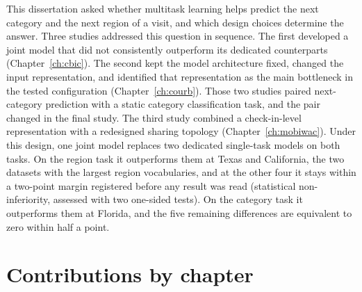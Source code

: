 This dissertation asked whether multitask learning helps predict the next category and
the next region of a visit, and which design choices determine the answer. Three studies
addressed this question in sequence. The first developed a joint model that did not
consistently outperform its dedicated counterparts (Chapter~\ref{ch:cbic}). The second
kept the model architecture fixed, changed the input representation, and identified that
representation as the main bottleneck in the tested configuration
(Chapter~\ref{ch:courb}). Those two studies paired next-category prediction with a static
category classification task, and the pair changed in the final study.
The third study combined a check-in-level representation with a redesigned sharing
topology (Chapter~\ref{ch:mobiwac}). Under this design, one joint model replaces two
dedicated single-task models on both tasks. On the region task it outperforms
them at Texas and California, the two datasets with the largest region vocabularies, and at
the other four it stays within a two-point margin registered before any result was read
(statistical non-inferiority, assessed with two one-sided tests). On the category task it
outperforms them at Florida, and the five remaining differences are equivalent to zero within
half a point.


\section{Contributions by chapter}
\label{sec:conc:contributions}

